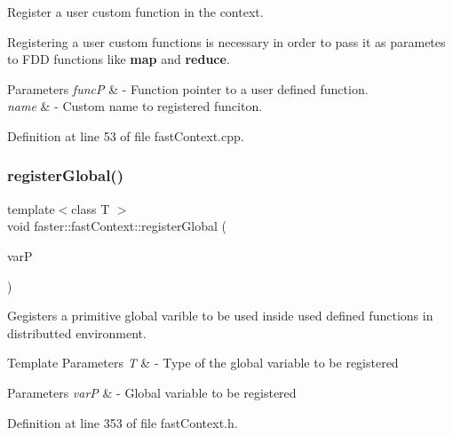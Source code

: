 Register a user custom function in the context. 

Registering a user custom functions is necessary in order to pass it as parametes to F\+DD functions like {\bfseries map} and {\bfseries reduce}.


\begin{DoxyParams}{Parameters}
{\em funcP} & -\/ Function pointer to a user defined function. \\
\hline
{\em name} & -\/ Custom name to registered funciton. \\
\hline
\end{DoxyParams}


Definition at line 53 of file fast\+Context.\+cpp.

\hypertarget{classfaster_1_1fastContext_a21c563c0ba6075a6dc31faf14dccb165}{}\label{classfaster_1_1fastContext_a21c563c0ba6075a6dc31faf14dccb165} 
\subsubsection{\texorpdfstring{register\+Global()}{registerGlobal()}\hspace{0.1cm}{\footnotesize\ttfamily [1/3]}}
{\footnotesize\ttfamily template$<$class T $>$ \\
void faster\+::fast\+Context\+::register\+Global (\begin{DoxyParamCaption}\item[{T $\ast$}]{varP }\end{DoxyParamCaption})}



Gegisters a primitive global varible to be used inside used defined functions in distributted environment. 


\begin{DoxyTemplParams}{Template Parameters}
{\em T} & -\/ Type of the global variable to be registered \\
\hline
\end{DoxyTemplParams}

\begin{DoxyParams}{Parameters}
{\em varP} & -\/ Global variable to be registered \\
\hline
\end{DoxyParams}


Definition at line 353 of file fast\+Context.\+h.

